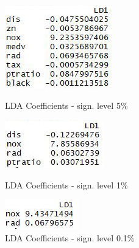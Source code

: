 \begin{figure}[H]
\centering
\begin{minipage}{0.32\textwidth}
\centering
    \includegraphics[width=0.8\linewidth]{Graphics/Assignment1/LDACoefficients_005_1.jpg}
    \caption{LDA Coefficients - sign. level 5\%}
    \label{fig:LDA_005_1}
\end{minipage}\hfill
\begin{minipage}{0.32\textwidth}
\centering

\includegraphics[width=0.8\linewidth]{Graphics/Assignment1/LDACoefficients_001_1.jpg}
    \caption{LDA Coefficients - sign. level 1\%}
    \label{fig:LDA_001_1}
\end{minipage}\hfill
\begin{minipage}{0.32\textwidth}
\centering

\includegraphics[width=.6\linewidth]{Graphics/Assignment1/LDACoefficients_0001_1.jpg}
    \caption{LDA Coefficients - sign. level 0.1\%}
    \label{fig:LDA_0001_1}
\end{minipage}
\end{figure}

